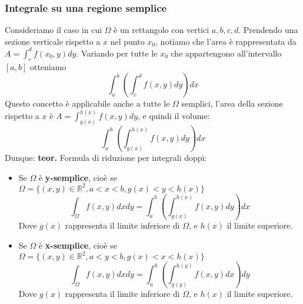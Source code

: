 \subsubsection{Integrale su una regione semplice}
Consideriamo il caso in cui $\Omega$ è un rettangolo con vertici $a, b, c, d$.\newline
Prendendo una sezione verticale rispetto a $x$ nel punto $x_0$, notiamo che l'area è rappresentata da $A = \int_{c}^{d}f(x_0, y)dy$. Variando per tutte le $x_0$ che appartengono all'intervallo $[a,b]$ otteniamo
\[
    \int_{a}^{b} \left(\int_{c}^{d}f(x,y) dy \right)dx
\]
Questo concetto è applicabile anche a tutte le $\Omega$ semplici, l'area della sezione rispetto a $x$ è $A = \int_{g(x)}^{h(x)}f(x,y)dy$, e quindi il volume:
\[
    \int_{a}^{b}\left(\int_{g(x)}^{h(x)}f(x,y) dy \right)dx
\]
Dunque:\newline
\textbf{teor.} Formula di riduzione per integrali doppi:
\begin{itemize}
    \item Se $\Omega$ è \textbf{y-semplice}, cioè se $\Omega = \{(x,y) \in \mathbb{R}^2, a< x<b, g(x)<y<h(x)\}$
    \[
        \int_{\Omega}f(x,y)dxdy = \int_{a}^{b}\left(\int_{g(x)}^{h(x)}f(x,y)dy\right)dx
    \]
    Dove $g(x)$ rappresenta il limite inferiore di $\Omega$, e $h(x)$ il limite superiore.
    \item Se $\Omega$ è \textbf{x-semplice}, cioè se $\Omega = \{(x,y) \in \mathbb{R}^2, a< y<b, g(x)<x<h(x)\}$
    \[
        \int_{\Omega}f(x,y)dxdy = \int_{a}^{b}\left(\int_{g(y)}^{h(y)}f(x,y)dx\right)dy
    \]
    Dove $g(x)$ rappresenta il limite inferiore di $\Omega$, e $h(x)$ il limite superiore.
\end{itemize}
